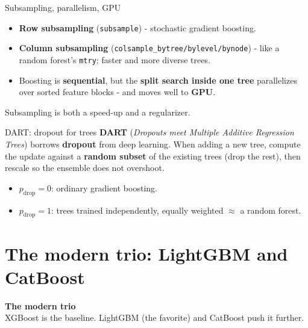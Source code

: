 \documentclass[aspectratio=169]{beamer}
\newcommand{\sectiontransition}[2]{%
  \begin{frame}[plain]
    \vfill
    \begin{center}
      {\Large\color{popblue}\textbf{#1}}\\[10pt]
      {\normalsize #2}
    \end{center}
    \vfill
  \end{frame}}
\begin{document}
\begin{frame}{Subsampling, parallelism, GPU}
  \begin{itemize}
    \item \textbf{Row subsampling} (\texttt{subsample}) - stochastic gradient boosting.
    \item \textbf{Column subsampling} (\texttt{colsample\_bytree/bylevel/bynode}) - like a random
      forest's \texttt{mtry}; faster and more diverse trees.
    \item Boosting is \textbf{sequential}, but the \textbf{split search inside one tree} parallelizes
      over sorted feature blocks - and moves well to \textbf{GPU}.
  \end{itemize}
  \vfill
  \footnotesize Subsampling is both a speed-up and a regularizer.
\end{frame}

\begin{frame}{DART: dropout for trees}
  \textbf{DART} (\emph{Dropouts meet Multiple Additive Regression Trees}) borrows \textbf{dropout}
  from deep learning. When adding a new tree, compute the update against a
  \textbf{random subset} of the existing trees (drop the rest), then rescale so the ensemble does
  not overshoot.
  \vskip 2pt
  \begin{center}
  \end{center}
  \vskip 2pt
  \begin{itemize}\small
    \item $p_{\text{drop}} = 0$: ordinary gradient boosting.
    \item $p_{\text{drop}} = 1$: trees trained independently, equally weighted $\approx$ a random forest.
  \end{itemize}
  \vfill
\end{frame}

\section{The modern trio: LightGBM and CatBoost}
\sectiontransition{The modern trio}{XGBoost is the baseline. LightGBM (the favorite) and CatBoost push it further.}
\end{document}

